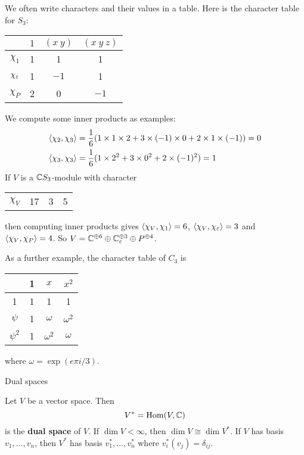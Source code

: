 \begin{exam}
  We often write characters and their values in a table.
  Here is the character table for $S_3$:
  \begin{center}
    \begin{tabular}[]{c | c c c}
      & $1$ & $(x\ y)$ & $(x\ y\ z)$ \\ \hline
      $\chi_1$ & 1 & 1 & 1 \\
      $\chi_\varepsilon$ & 1 & $-1$ & 1 \\
      $\chi_P$ & 2 & 0 & $-1$
    \end{tabular}
  \end{center}
  We compute some inner products as examples:
  \begin{align*}
    {\left\langle \chi_2,\chi_3 \right\rangle} &= \frac{1}{6}(1 \times 1 \times 2 + 3 \times (-1) \times 0 + 2 \times 1 \times (-1)) = 0 \\
    {\left\langle \chi_3,\chi_3 \right\rangle} &= \frac{1}{6}(1 \times 2^2 + 3 \times 0^2 + 2 \times(-1)^2) = 1 \\
  \end{align*}
  If $V$ is a $\mathbb{C} S_3$-module with character
  \begin{center}
    \begin{tabular}[]{c | c c c}\hline
      $\chi_V$ & 17 & 3 & 5
    \end{tabular}
  \end{center}
  then computing inner products gives ${\left\langle \chi_V,\chi_1 \right\rangle}=6$, ${\left\langle \chi_V,\chi_\varepsilon \right\rangle}=3$ and ${\left\langle \chi_V,\chi_P \right\rangle}=4$.
  So $V = \mathbb{C}^{\oplus 6} \oplus \mathbb{C}_\varepsilon^{\oplus 3} \oplus P^{\oplus 4}$.

  As a further example, the character table of $C_3$ is
  \begin{center}
    \begin{tabular}[]{c | c c c}
      & 1 & $x$ & $x^2$ \\ \hline
      1 & 1 & 1 & 1 \\
      $\psi$ & 1 & $\omega$ & $\omega^2$ \\
      $\psi^2$ & 1 & $\omega^2$ & $\omega$
    \end{tabular}
  \end{center}
  where $\omega = \exp(e\pi i/3)$.
\end{exam}

Dual spaces

\begin{defn}
  Let $V$ be a vector space.
  Then
  \[V^* = \operatorname{Hom}(V,\mathbb{C})\]
  is the \textbf{dual space} of $V$.
  If $\dim V <\infty$, then $\dim V \cong \dim V^*$.
  If $V$ has basis $v_1,\ldots,v_n$, then $V^*$ has basis $v_1^*,\ldots,v_n^*$ where $v_i^*(v_j) = \delta_{ij}$.
\end{defn}

